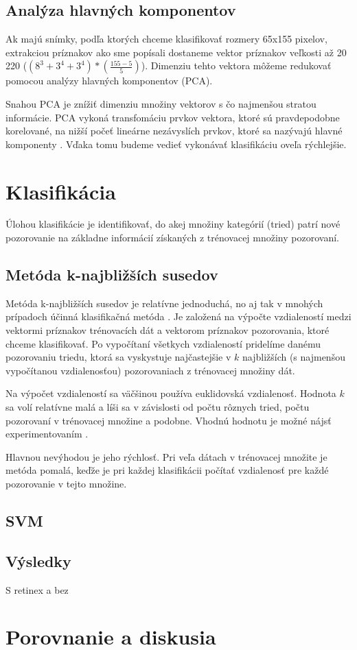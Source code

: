 \subsection{Analýza hlavných komponentov}
Ak majú snímky, podľa ktorých chceme klasifikovať rozmery 65x155 pixelov, extrakciou príznakov ako sme popísali dostaneme vektor príznakov veľkosti až 20 220 ($(8^3 + 3^4 + 3^4)*(\frac{155-5}{5})$).
Dimenziu tehto vektora môžeme redukovať pomocou analýzy hlavných komponentov (PCA).

Snahou PCA je znížiť dimenziu množiny vektorov s čo najmenšou stratou informácie.
PCA vykoná transfomáciu prvkov vektora, ktoré sú pravdepodobne korelované, na nižší počeť lineárne nezávyslích prvkov, ktoré sa nazývajú hlavné komponenty \cite{pca}.
Vďaka tomu budeme vedieť vykonávať klasifikáciu oveľa rýchlejšie.

\section{Klasifikácia}
Úlohou klasifikácie je identifikovať, do akej množiny kategórií (tried) patrí nové pozorovanie na základne informácií získaných z trénovacej množiny pozorovaní.
\subsection{Metóda k-najbližších susedov}
Metóda k-najbližších susedov je relatívne jednoduchá, no aj tak v mnohých prípadoch účinná klasifikačná metóda \cite{knn}.
Je založená na výpočte vzdialeností medzi vektormi príznakov trénovacích dát a vektorom príznakov pozorovania, ktoré chceme klasifikovať.
Po vypočítaní všetkych vzdialeností pridelíme danému pozorovaniu triedu, ktorá sa vyskystuje najčastejšie v $k$ najbližších (s najmenšou vypočítanou vzdialenosťou) pozorovaniach z trénovacej množiny dát.

Na výpočet vzdialeností sa väčšinou používa euklidovská vzdialenosť.
Hodnota $k$ sa volí relatívne malá a líši sa v závislosti od počtu rôznych tried, počtu pozorovaní v trénovacej množine a podobne. 
Vhodnú hodnotu je možné nájsť experimentovaním \cite{knn}.

Hlavnou nevýhodou je jeho rýchlosť. 
Pri veľa dátach v trénovacej množite je metóda pomalá, keďže je pri každej klasifikácii počítať vzdialenosť pre každé pozorovanie v tejto množine.

\subsection{SVM}
\subsection{Výsledky}
S retinex a bez
\section{Porovnanie a diskusia}